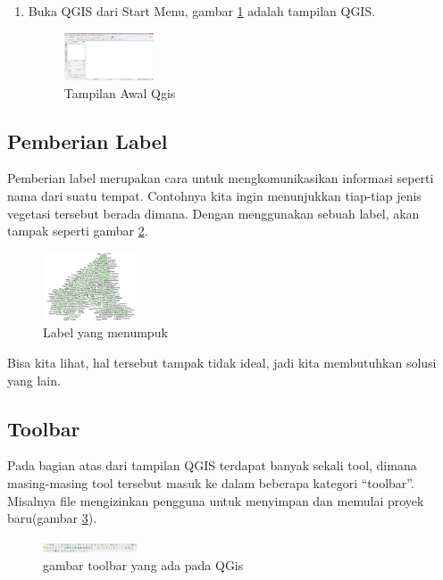 \begin{enumerate}
\begin{figure}[ht]
        \end{figure}
\item
Buka QGIS dari Start Menu, gambar \ref{image12} adalah tampilan QGIS.
\begin{figure}[ht]
        \centerline{\includegraphics[width=0.25\textwidth]{figures/image12}}
        \caption{Tampilan Awal Qgis}
        \label{image12}
        \end{figure}
\end{enumerate}

\subsection{Pemberian Label}
Pemberian label merupakan cara untuk mengkomunikasikan informasi seperti nama dari suatu tempat. Contohnya kita ingin menunjukkan tiap-tiap jenis vegetasi tersebut berada dimana. Dengan menggunakan sebuah label, akan tampak seperti gambar \ref{image13}.
\begin{figure}[ht]
        \centerline{\includegraphics[width=0.25\textwidth]{figures/image13}}
        \caption{Label yang menumpuk}
        \label{image13}
        \end{figure}
Bisa kita lihat, hal tersebut tampak tidak ideal, jadi kita membutuhkan solusi yang lain. 


\subsection{Toolbar}
Pada bagian atas dari tampilan QGIS terdapat banyak sekali tool, dimana masing-masing tool tersebut masuk ke dalam beberapa kategori “toolbar”. Misalnya file mengizinkan pengguna untuk menyimpan dan memulai proyek baru(gambar \ref{toolbar}).
\begin{figure}[ht]
    \centerline{\includegraphics[width=0.25\textwidth]{figures/toolbar}}
    \caption{gambar toolbar yang ada pada QGis}
    \label{toolbar}
    \end{figure}

